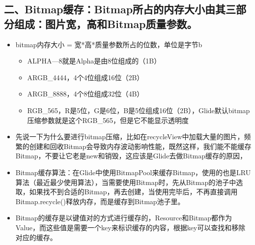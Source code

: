 \documentclass[9pt, b5paper]{article}
\begin{document}
\subsection{二、Bitmap缓存：Bitmap所占的内存大小由其三部分组成：图片宽，高和Bitmap质量参数。}
\label{sec-7-2}
\begin{itemize}
\item bitmap内存大小 = 宽*高*质量参数所占的位数，单位是字节b
\begin{itemize}
\item ALPHA—8就是Alpha是由8位组成的（1B）
\item ARGB\_4444，4个4位组成16位（2B）
\item ARGB\_8888，4个8位组成32位（4B）
\item RGB\_565，R是5位，G是6位，B是5位组成16位（2B），Glide默认bitmap压缩参数就是这个RGB\_565，但是它不能显示透明度
\end{itemize}
\item 先说一下为什么要进行bitmap压缩，比如在recycleView中加载大量的图片，频繁的创建和回收Bitmap会导致内存波动影响性能，既然这样，我们能不能缓存Bitmap，不要让它老是new和销毁，这应该是Glide去做Bitmap缓存的原因，
\item Bitmap缓存算法：在Glide中使用BitmapPool来缓存Bitmap，使用的也是LRU算法（最近最少使用算法），当需要使用Bitmap时，先从Bitmap的池子中选取，如果找不到合适的Bitmap，再去创建，当使用完毕后，不再直接调用Bitmap.recycle()释放内存，而是缓存到Bitmap池子里。
\item Bitmap的缓存是以键值对的方式进行缓存的，Resource和Bitmap都作为Value，而这些值是需要一个key来标识缓存的内容，根据key可以查找和移除对应的缓存。
\end{itemize}
\end{document}
